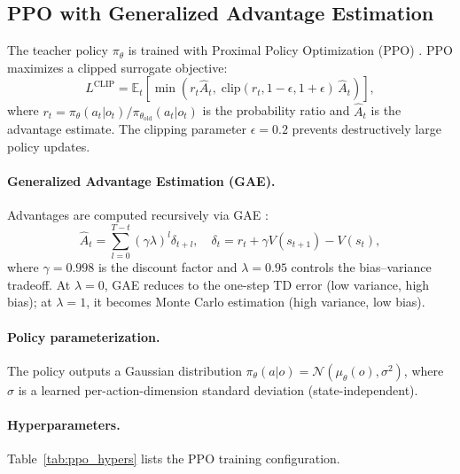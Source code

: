 \documentclass[10pt,twocolumn]{article}
\newcommand{\E}{\mathbb{E}}
\newcommand{\clip}{\mathrm{clip}}
\begin{document}
\subsection{PPO with Generalized Advantage Estimation}
\label{sec:ppo}

The teacher policy $\pi_\theta$ is trained with Proximal Policy
Optimization (PPO) \cite{schulman2017proximal}.  PPO maximizes a
clipped surrogate objective:
\begin{equation}
  L^{\text{CLIP}} = \E_t\!\left[\min\!\left(
      r_t \hat{A}_t,\;
      \clip(r_t, 1{-}\epsilon, 1{+}\epsilon)\,\hat{A}_t
  \right)\right],
  \label{eq:ppo}
\end{equation}
where $r_t = \pi_\theta(a_t|o_t) / \pi_{\theta_{\text{old}}}(a_t|o_t)$
is the probability ratio and $\hat{A}_t$ is the advantage estimate.
The clipping parameter $\epsilon = 0.2$ prevents destructively large
policy updates.

\paragraph{Generalized Advantage Estimation (GAE).}
Advantages are computed recursively via GAE
\cite{schulman2016high}:
\begin{equation}
  \hat{A}_t = \sum_{l=0}^{T-t} (\gamma\lambda)^l \delta_{t+l},
  \quad
  \delta_t = r_t + \gamma V(s_{t+1}) - V(s_t),
  \label{eq:gae}
\end{equation}
where $\gamma = 0.998$ is the discount factor and $\lambda = 0.95$
controls the bias--variance tradeoff.  At $\lambda = 0$, GAE reduces
to the one-step TD error (low variance, high bias); at $\lambda = 1$,
it becomes Monte Carlo estimation (high variance, low bias).

\paragraph{Policy parameterization.}
The policy outputs a Gaussian distribution
$\pi_\theta(a|o) = \mathcal{N}(\mu_\theta(o), \sigma^2)$, where
$\sigma$ is a learned per-action-dimension standard deviation
(state-independent).

\paragraph{Hyperparameters.}
Table~\ref{tab:ppo_hypers} lists the PPO training configuration.
\end{document}
